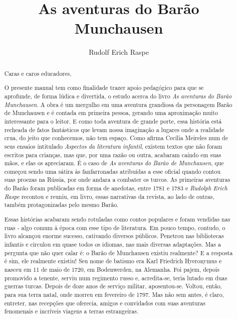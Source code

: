 \documentclass[11pt]{extarticle}
\newcommand{\AutorLivro}{Rudolf Erich Raspe}
\newcommand{\TituloLivro}{As aventuras do Barão Munchausen}
\newcommand{\colaborador}{Gabriela Karam}
\begin{document}
\title{\TituloLivro}
\author{\AutorLivro}
\def\authornotes{\colaborador}

\date{}
\maketitle


\tableofcontents


\begin{abstract}

Caras e caros educadores,

O presente manual tem como finalidade trazer apoio pedagógico para que se aprofunde, de forma lúdica e divertida, o estudo acerca do livro \textit{As aventuras do Barão Munchausen}. A obra é um mergulho em uma aventura grandiosa da personagem Barão de Munchausen e é contada em primeira pessoa, gerando uma aproximação muito interessante para o leitor. E como toda aventura de grande porte, essa história está recheada de fatos fantásticos que levam nossa imaginação a lugares onde a realidade crua, do jeito que conhecemos, não tem espaço. Como afirma Cecília Meireles num de seus ensaios intitulado \textit{Aspectos da literatura infantil}, existem textos que não foram escritos para crianças, mas que, por uma razão ou outra, acabaram caindo em suas mãos, e elas os apreciaram. É o caso de \textit{As aventuras do Barão de Munchausen}, que começou sendo uma sátira às fanfarronadas atribuídas a esse oficial quando contou suas proezas na Rússia, por onde andara a combater os turcos. As primeiras aventuras do Barão foram publicadas em forma de anedotas, entre 1781 e 1783 e \textit{Rudolph Erich Raspe} recontou e reuniu, em livro, essas narrativas da revista, ao lado de outras, também protagonizadas pelo mesmo Barão. 

Essas histórias acabaram sendo rotuladas como contos populares e foram vendidas nas ruas - algo comum à época com esse tipo de literatura. Em pouco tempo, contudo, o livro alcançou enorme sucesso, cativando diversos públicos. Penetrou nas bibliotecas infantis e circulou em quase todos os idiomas, nas mais diversas adaptações. Mas a pergunta que não quer calar é: o Barão de Munchausen existiu realmente? E a resposta é sim, ele realmente existiu! Seu nome de batismo era Karl Friedrich Hyeronymus e nasceu em 11 de maio de 1720, em Bodenwerden, na Alemanha. Foi pajem, depois promovido a tenente, serviu num regimento russo e, acredita-se, teria lutado em duas guerras turcas. Depois de doze anos de serviço militar, aposentou-se. Voltou, então, para sua terra natal, onde morreu em fevereiro de 1797. Mas não sem antes, é claro, entreter, nas recepções que oferecia, amigos e convidados com suas aventuras fenomenais e incríveis viagens a terras estrangeiras. 


\end{abstract}
\end{document}
